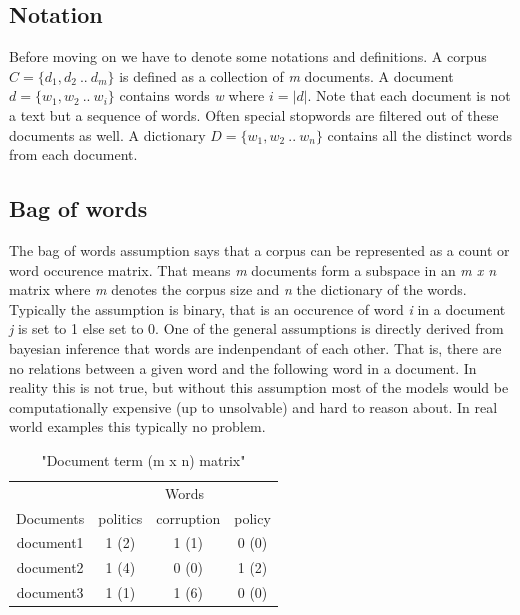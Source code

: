   \subsection{Notation}
    Before moving on we have to denote some notations and definitions. 
    A corpus $C = \{d_1, d_2 \: .. \: d_m\}$ is defined as a collection of \emph{m} documents. A document $d = \{w_1, w_2 \: .. \: w_i\}$ contains words \emph{w} where $i = |d|$. Note that each document is not a text but a sequence of words. Often special stopwords are filtered out of these documents as well. A dictionary $D = \{w_1, w_2 \: .. \: w_n\}$ contains all the distinct words from each document.

  \subsection{Bag of words}
    The bag of words assumption says that a corpus can be represented as a count or word occurence matrix. That means \emph{m} documents form a subspace in an \emph{m x n} matrix where \emph{m} denotes the corpus size and \emph{n} the dictionary of the words. Typically the assumption is binary, that is an occurence of word \emph{i} in a document \emph{j} is set to 1 else set to 0. One of the general assumptions is directly derived from bayesian inference that words are indenpendant of each other. That is, there are no relations between a given word and the following word in a document. In reality this is not true, but without this assumption most of the models would be computationally expensive (up to unsolvable) and hard to reason about. In real world examples this typically no problem. \cite{Nothing}

    \begin{table}[h!]
      \centering
      \begin{tabular}{c|c|c|c}
        \multicolumn{1}{r|}{} & \multicolumn{3}{c}{Words} \\
        \cline{1-4}
        Documents &   politics &   corruption &  policy  \\
        \hline
        document1 &    1 (2)   &     1 (1)    &   0 (0)  \\
        document2 &    1 (4)   &     0 (0)    &   1 (2)  \\
        document3 &    1 (1)   &     1 (6)    &   0 (0)  \\
      \end{tabular}\\
      \caption{"Document term (m x n) matrix"}
    \end{table}

